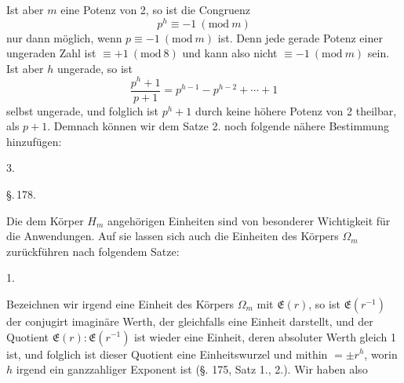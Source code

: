 
Ist aber $m$ eine Potenz von 2, so ist die Congruenz
\[
p^h \equiv -1 \ (\mathrm{mod}\ m)
\]
nur dann möglich, wenn $p \equiv -1\ (\mathrm{mod}\ m)$ ist. Denn jede gerade Potenz einer ungeraden Zahl ist $\equiv + 1\ (\mathrm{mod}\ 8)$ und kann also nicht $\equiv -1\ (\mathrm{mod}\ m)$ sein. Ist aber $h$ ungerade, so ist
\[
\frac{p^h + 1}{p + 1} = p^{h-1} - p^{h-2} + \cdots + 1
\]
selbst ungerade, und folglich ist $p^h + 1$ durch keine höhere Potenz von 2 theilbar, als $p + 1$. Demnach können wir dem Satze 2. noch folgende nähere Bestimmung hinzufügen:

3. 


\begin{center}
\S.\,178.\\[4pt]
\end{center}

Die dem Körper $H_m$ angehörigen Einheiten sind von besonderer Wichtigkeit für die Anwendungen. Auf sie lassen sich auch die Einheiten des Körpers $\Omega_m$ zurückführen nach folgendem Satze:

1. 

Bezeichnen wir irgend eine Einheit des Körpers $\Omega_m$ mit $\mathfrak{E}(r)$, so ist $\mathfrak{E}(r^{-1})$ der conjugirt imaginäre Werth, der gleichfalls eine Einheit darstellt, und der Quotient $\mathfrak{E}(r) : \mathfrak{E}(r^{-1})$ ist wieder eine Einheit, deren absoluter Werth
gleich 1 ist, und folglich ist dieser Quotient eine Einheitswurzel und mithin $= \pm r^h$, worin $h$ irgend ein ganzzahliger Exponent ist (§. 175, Satz 1., 2.). Wir haben also

